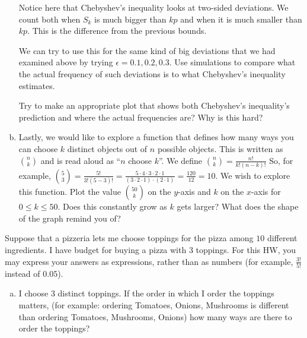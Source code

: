 \documentclass[]{article}
\newif\ifsolutions
\renewcommand{\answer}[1]{{\color{mydarkblue}\textbf{Solution:}#1}}
\begin{document}
\begin{qunlist}
\begin{enumerate}[a)]
Notice here that Chebyshev's inequality looks at two-sided
deviations. We count both when $S_k$ is much bigger than $kp$ and when
it is much smaller than $kp$. This is the difference from the previous
bounds. 

We can try to use this for the same kind of big deviations that we had
examined above by trying $\epsilon = 0.1, 0.2, 0.3$. Use simulations to
compare what the actual frequency of such deviations is to what
Chebyshev's inequality estimates.  

Try to make an appropriate plot that shows both Chebyshev's
inequality's prediction and where the actual frequencies are? Why is
this hard?

\qpart
\item Lastly, we would like to explore a function that defines how many ways you can choose $k$ distinct objects out of $n$ possible objects. This is written as $\binom{n} {k}$ and is read aloud as ``$n$ choose $k$''. We define $\binom{n}{k} = \frac{n!}{k!(n-k)!}$ So, for example, $\binom{5}{3} = \frac{5!}{3!(5-3)!} = \frac{5\cdot 4 \cdot 3 \cdot 2 \cdot 1}{(3 \cdot 2 \cdot 1) \cdot (2 \cdot 1)} = \frac{120}{12} = 10$. We wish to explore this function. Plot the value $\binom{50}{k}$ on the $y$-axis and $k$ on the $x$-axis for $0 \leq k \leq 50$.
Does this constantly grow as $k$ gets larger? What does the shape of the graph remind you of?

\end{enumerate}




Suppose that a pizzeria lets me choose toppings for the pizza among $10$ different ingredients. I have budget for buying a pizza with $3$ toppings. For this HW, you may express your answers as expressions, rather than as numbers (for example, $\frac{3!}{5!}$ instead of $0.05$).

\begin{enumerate}[a)]
  \qpart 
\item I choose $3$ distinct toppings. If the order in which I order the toppings matters, (for example: ordering Tomatoes, Onions, Mushrooms is different than ordering Tomatoes, Mushrooms, Onions) how many ways are there to order the toppings?

\ifsolutions{ \answer { 
$10*9*8$

}}\fi
  

\end{enumerate}
\end{qunlist}
\end{document}
